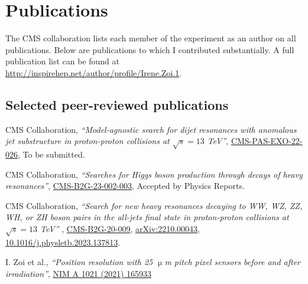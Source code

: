 \ifacademic
  \section{Publications}
The CMS collaboration lists each member of the experiment as an author on all publications. Below are publications to which I contributed substantially. A full publication list can be found at \\ \href{http://inspirehep.net/author/profile/Irene.Zoi.1}{http://inspirehep.net/author/profile/Irene.Zoi.1}.  

\subsection{Selected peer-reviewed publications}
\begin{refsection}
      \vspace{2mm}
      \onehalfspacing
CMS Collaboration, {\sl ``Model-agnostic search for dijet resonances with anomalous jet substructure in proton-proton collisions at $\sqrt{s}=13$ TeV''},
\href{https://cds.cern.ch/record/2892677?ln=en}{CMS-PAS-EXO-22-026},
To be submitted.
    \end{refsection}  
  
\begin{refsection}
      \vspace{2mm}
      \onehalfspacing
CMS Collaboration, {\sl ``Searches for Higgs boson production through decays of heavy resonances''},
\href{https://cds.cern.ch/record/2892661}{CMS-B2G-23-002-003},
Accepted by Physics Reports.
    \end{refsection}

    \begin{refsection}
      \vspace{2mm}
      \onehalfspacing
CMS Collaboration, {\sl ``Search for new heavy resonances decaying to WW, WZ, ZZ, WH, or ZH boson pairs in the all-jets final state in proton-proton collisions at $\sqrt{s}=13$ TeV''} ,
\href{https://cds.cern.ch/record/2835154?ln=en}{CMS-B2G-20-009},
\href{https://arxiv.org/abs/2210.00043}{arXiv:2210.00043},
\href{http://dx.doi.org/10.1016/j.physletb.2023.137813}{10.1016/j.physletb.2023.137813}.
    \end{refsection}
    
    
     \begin{refsection}
      \vspace{2mm}
      \onehalfspacing
I. Zoi et al., {\sl ``Position resolution with 25 $\upmu$m pitch pixel sensors before and after irradiation''},  \href{https://www.sciencedirect.com/science/article/pii/S0168900221008962}{NIM A 1021 (2021) 165933}

    \end{refsection}


